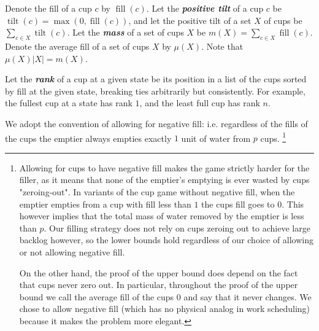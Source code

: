 \documentclass[twocolumn]{article}[10pt]
\newcommand{\defn}[1]{{\textit{\textbf{\boldmath #1}}}\xspace}
\DeclareMathOperator{\tilt}{\text{tilt}}
\DeclareMathOperator{\fil}{\text{fill}}
\begin{document}
Denote the fill of a cup $c$ by $\fil(c)$. Let the \defn{positive tilt} of a cup $c$ be
$\tilt(c) = \max(0, \fil(c))$, and let the positive tilt of a set $X$ of
cups be $\sum_{c\in X} \tilt(c)$. Let the \defn{mass} of a set of cups $X$
be $m(X) = \sum_{c\in X} \fil(c)$. Denote the average fill of a set of cups $X$ by 
$\mu(X)$. Note that $\mu(X) |X| = m(X)$.

Let the \defn{rank} of a cup at a given state be its position in a list of the
cups sorted by fill at the given state, breaking ties arbitrarily but
consistently. For example, the fullest cup at a state has rank $1$, and the
least full cup has rank $n$.

We adopt the convention of allowing for negative fill: i.e. regardless of the
fills of the cups the emptier always empties exactly $1$ unit of water from
$p$ cups. \footnote{
  Allowing for cups to have negative fill makes the game strictly harder for
  the filler, as it means that none of the emptier's emptying is ever wasted by
  cups "zeroing-out". In variants of the cup game without negative fill, when
  the emptier empties from a cup with fill less than $1$ the cups fill goes to
  $0$. This however implies that the total mass of water removed by the emptier
  is less than $p$. Our filling strategy does not rely on cups zeroing out to
  achieve large backlog however, so the lower bounds hold regardless of our
  choice of allowing or not allowing negative fill. 

  On the other hand, the proof of the upper bound does depend on the fact that
  cups never zero out. In particular, throughout the proof of the upper bound
  we call the average fill of the cups $0$ and say that it never changes. We
  chose to allow negative fill (which has no physical analog in work
  scheduling) because it makes the problem more elegant.
}
\end{document}
